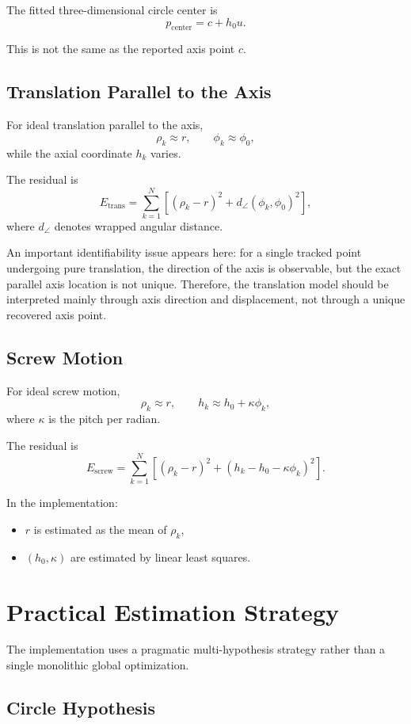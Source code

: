 \documentclass[11pt]{article}
\begin{document}
The fitted three-dimensional circle center is
\[
p_{\mathrm{center}} = c + h_0 u.
\]

This is not the same as the reported axis point $c$.

\subsection{Translation Parallel to the Axis}

For ideal translation parallel to the axis,
\[
\rho_k \approx r, \qquad \phi_k \approx \phi_0,
\]
while the axial coordinate $h_k$ varies.

The residual is
\[
E_{\mathrm{trans}}
=
\sum_{k=1}^{N}
\left[
(\rho_k - r)^2 + d_{\angle}(\phi_k,\phi_0)^2
\right],
\]
where $d_{\angle}$ denotes wrapped angular distance.

An important identifiability issue appears here: for a single tracked point undergoing pure translation, the direction of the axis is observable, but the exact parallel axis location is not unique. Therefore, the translation model should be interpreted mainly through axis direction and displacement, not through a unique recovered axis point.

\subsection{Screw Motion}

For ideal screw motion,
\[
\rho_k \approx r, \qquad h_k \approx h_0 + \kappa \phi_k,
\]
where $\kappa$ is the pitch per radian.

The residual is
\[
E_{\mathrm{screw}}
=
\sum_{k=1}^{N}
\left[
(\rho_k - r)^2 + (h_k - h_0 - \kappa \phi_k)^2
\right].
\]

In the implementation:
\begin{itemize}
    \item $r$ is estimated as the mean of $\rho_k$,
    \item $(h_0,\kappa)$ are estimated by linear least squares.
\end{itemize}

\section{Practical Estimation Strategy}

The implementation uses a pragmatic multi-hypothesis strategy rather than a single monolithic global optimization.

\subsection{Circle Hypothesis}
\end{document}
